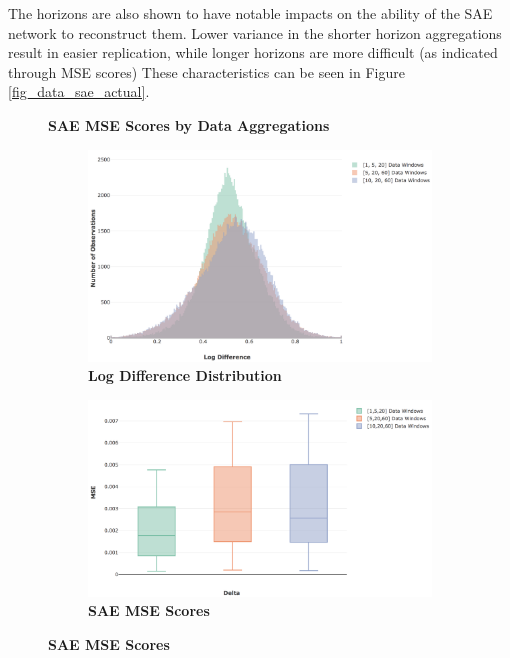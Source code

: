\documentclass[a4paper,11pt,oneside]{article}
\theoremstyle{plain}
\theoremstyle{definition}
\begin{document}
	The horizons are also shown to have notable impacts on the ability of the SAE network to reconstruct them. Lower variance in the shorter horizon aggregations result in easier replication, while longer horizons are more difficult (as indicated through MSE scores) These characteristics can be seen in Figure \ref{fig_data_sae_actual}.	
	
	
	\begin{figure}[H]
		\centering
		\textbf{SAE MSE Scores by Data Aggregations}
		\begin{subfigure}{.5\textwidth}
			\centering 
			\includegraphics[scale=0.25]{images/results/data/actual_aggregate_dist.png}
			\caption{\textbf{Log Difference Distribution}
				\newline }
			\label{figure-actual_aggregate_dist}
		\end{subfigure}%
		\begin{subfigure}{.5\textwidth}
			\centering 
			\includegraphics[scale=0.26]{images/results/data/actual_aggregation_mse.png}
			\caption{\textbf{SAE MSE Scores} 
				\newline }

\end{subfigure}
\end{figure}
\end{document}
